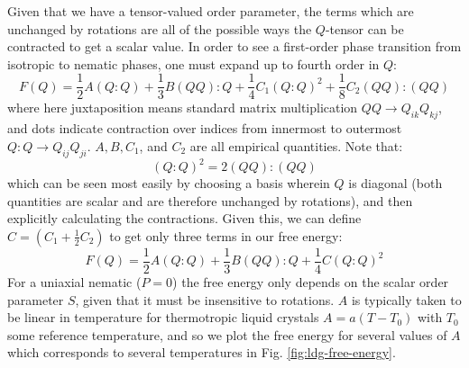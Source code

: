 \documentclass[reqno]{article}
\begin{document}
  Given that we have a tensor-valued order parameter, the terms which are
  unchanged by rotations are all of the possible ways the $Q$-tensor can be
  contracted to get a scalar value.
  In order to see a first-order phase transition from isotropic to nematic
  phases, one must expand up to fourth order in $Q$:
  \begin{equation}
    F(Q)
    =
    \frac12 A (Q:Q)
    + \frac13 B (QQ):Q
    + \frac14 C_1 (Q:Q)^2
    + \frac18 C_2 (QQ):(QQ)
  \end{equation}
  where here juxtaposition means standard matrix multiplication $QQ \to Q_{ik}
  Q_{kj}$, and dots indicate contraction over indices from innermost to
  outermost $Q:Q \to Q_{ij} Q_{ji}$.
  $A, B, C_1$, and $C_2$ are all empirical quantities.
  Note that:
  \begin{equation}
    (Q:Q)^2 = 2(QQ):(QQ)
  \end{equation}
  which can be seen most easily by choosing a basis wherein $Q$ is diagonal
  (both quantities are scalar and are therefore unchanged by rotations), and
  then explicitly calculating the contractions.
  Given this, we can define $C = (C_1 + \tfrac12 C_2)$ to get only three terms in
  our free energy:
  \begin{equation} \label{eq:landau-de-gennes-bulk-energy}
    F(Q)
    =
    \frac12 A(Q:Q)
    + \frac13 B (QQ):Q
    + \frac14 C (Q:Q)^2
  \end{equation}
  For a uniaxial nematic ($P = 0$) the free energy only depends on the scalar
  order parameter $S$, given that it must be insensitive to rotations.
  $A$ is typically taken to be linear in temperature for thermotropic liquid
  crystals $A = a(T - T_0)$ with $T_0$ some reference temperature, and so we plot
  the free energy for several values of $A$ which corresponds to several
  temperatures in Fig. \ref{fig:ldg-free-energy}.
  
\end{document}

